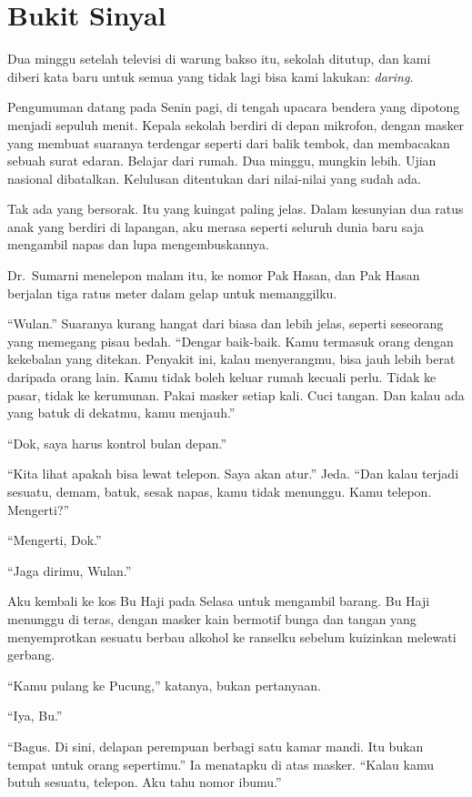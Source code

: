 \documentclass[11pt,twoside,openany]{book}
\begin{document}
\chapter{Bukit Sinyal}
Dua minggu setelah televisi di warung bakso itu, sekolah ditutup, dan kami diberi kata baru untuk semua yang tidak lagi bisa kami lakukan: \emph{daring}.

Pengumuman datang pada Senin pagi, di tengah upacara bendera yang dipotong menjadi sepuluh menit. Kepala sekolah berdiri di depan mikrofon, dengan masker yang membuat suaranya terdengar seperti dari balik tembok, dan membacakan sebuah surat edaran. Belajar dari rumah. Dua minggu, mungkin lebih. Ujian nasional dibatalkan. Kelulusan ditentukan dari nilai-nilai yang sudah ada.

Tak ada yang bersorak. Itu yang kuingat paling jelas. Dalam kesunyian dua ratus anak yang berdiri di lapangan, aku merasa seperti seluruh dunia baru saja mengambil napas dan lupa mengembuskannya.

Dr.~Sumarni menelepon malam itu, ke nomor Pak Hasan, dan Pak Hasan berjalan tiga ratus meter dalam gelap untuk memanggilku.

``Wulan.'' Suaranya kurang hangat dari biasa dan lebih jelas, seperti seseorang yang memegang pisau bedah. ``Dengar baik-baik. Kamu termasuk orang dengan kekebalan yang ditekan. Penyakit ini, kalau menyerangmu, bisa jauh lebih berat daripada orang lain. Kamu tidak boleh keluar rumah kecuali perlu. Tidak ke pasar, tidak ke kerumunan. Pakai masker setiap kali. Cuci tangan. Dan kalau ada yang batuk di dekatmu, kamu menjauh.''

``Dok, saya harus kontrol bulan depan.''

``Kita lihat apakah bisa lewat telepon. Saya akan atur.'' Jeda. ``Dan kalau terjadi sesuatu, demam, batuk, sesak napas, kamu tidak menunggu. Kamu telepon. Mengerti?''

``Mengerti, Dok.''

``Jaga dirimu, Wulan.''

Aku kembali ke kos Bu Haji pada Selasa untuk mengambil barang. Bu Haji menunggu di teras, dengan masker kain bermotif bunga dan tangan yang menyemprotkan sesuatu berbau alkohol ke ranselku sebelum kuizinkan melewati gerbang.

``Kamu pulang ke Pucung,'' katanya, bukan pertanyaan.

``Iya, Bu.''

``Bagus. Di sini, delapan perempuan berbagi satu kamar mandi. Itu bukan tempat untuk orang sepertimu.'' Ia menatapku di atas masker. ``Kalau kamu butuh sesuatu, telepon. Aku tahu nomor ibumu.''
\end{document}
